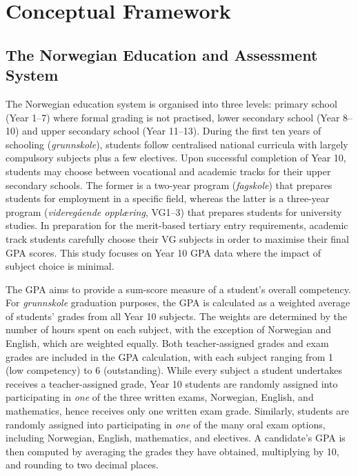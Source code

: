 \section{Conceptual Framework}

\subsection{The Norwegian Education and Assessment System}

The Norwegian education system is organised into three levels: primary school (Year 1--7) where formal grading is not practised, lower secondary school (Year 8--10) and upper secondary school (Year 11--13). During the first ten years of schooling (\textit{grunnskole}), students follow centralised national curricula with largely compulsory subjects plus a few electives. Upon successful completion of Year 10, students may choose between vocational and academic tracks for their upper secondary schools. The former is a two-year program (\textit{fagskole}) that prepares students for employment in a specific field, whereas the latter is a three-year program (\textit{videreg{\aa}ende oppl{\ae}ring}, VG1--3) that prepares students for university studies. In preparation for the merit-based tertiary entry requirements, academic track students carefully choose their VG subjects in order to maximise their final GPA scores. This study focuses on Year 10 GPA data where the impact of subject choice is minimal.

The GPA aims to provide a sum-score measure of a student's overall competency. For \textit{grunnskole} graduation purposes, the GPA is calculated as a weighted average of students' grades from all Year 10 subjects. The weights are determined by the number of hours spent on each subject, with the exception of Norwegian and English, which are weighted equally. Both teacher-assigned grades and exam grades are included in the GPA calculation, with each subject ranging from 1 (low competency) to 6 (outstanding). While every subject a student undertakes receives a teacher-assigned grade, Year 10 students are randomly assigned into participating in \emph{one} of the three written exams, Norwegian, English, and mathematics, hence receives only one written exam grade. Similarly, students are randomly assigned into participating in \emph{one} of the many oral exam options, including Norwegian, English, mathematics, and electives. A candidate's GPA is then computed by averaging the grades they have obtained, multiplying by 10, and rounding to two decimal places.